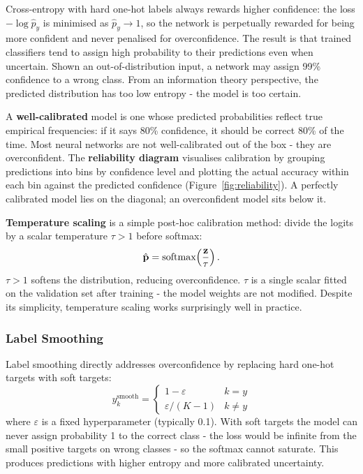 Cross-entropy with hard one-hot labels always rewards higher confidence: the loss $-\log \hat{p}_y$ is minimised as $\hat{p}_y \to 1$, so the network is perpetually rewarded for being more confident and never penalised for overconfidence. The result is that trained classifiers tend to assign high probability to their predictions even when uncertain. Shown an out-of-distribution input, a network may assign 99\% confidence to a wrong class. From an information theory perspective, the predicted distribution has too low entropy - the model is too certain.

A \textbf{well-calibrated} model is one whose predicted probabilities reflect true empirical frequencies: if it says 80\% confidence, it should be correct 80\% of the time. Most neural networks are not well-calibrated out of the box - they are overconfident. The \textbf{reliability diagram} visualises calibration by grouping predictions into bins by confidence level and plotting the actual accuracy within each bin against the predicted confidence (Figure~\ref{fig:reliability}). A perfectly calibrated model lies on the diagonal; an overconfident model sits below it.

\textbf{Temperature scaling} \parencite{Guo2017} is a simple post-hoc calibration method: divide the logits by a scalar temperature $\tau > 1$ before softmax:
\begin{equation}
    \hat{\mathbf{p}} = \text{softmax}\!\left(\frac{\mathbf{z}}{\tau}\right).
\end{equation}
$\tau > 1$ softens the distribution, reducing overconfidence. $\tau$ is a single scalar fitted on the validation set after training - the model weights are not modified. Despite its simplicity, temperature scaling works surprisingly well in practice.

\subsubsection{Label Smoothing}

Label smoothing \parencite{Szegedy2016} directly addresses overconfidence by replacing hard one-hot targets with soft targets:
\begin{equation}
    y_k^{\text{smooth}} = \begin{cases} 1 - \varepsilon & k = y \\ \varepsilon / (K-1) & k \neq y \end{cases}
\end{equation}
where $\varepsilon$ is a fixed hyperparameter (typically 0.1). With soft targets the model can never assign probability 1 to the correct class - the loss would be infinite from the small positive targets on wrong classes - so the softmax cannot saturate. This produces predictions with higher entropy and more calibrated uncertainty.

